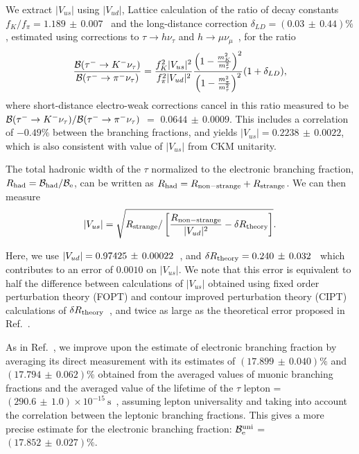 \documentclass[fleqn,twoside]{article}
\def\Vus  {\ensuremath{|V_{us}|}\xspace}
\def\Vud  {\ensuremath{|V_{ud}|}\xspace}
\def\mtau       {\ensuremath{\tau}\xspace}
\begin{document}
We extract $\Vus$ using $\Vud$, Lattice calculation of the ratio of decay constants
$f_K/f_\pi = 1.189\, \pm\, 0.007$~\cite{Follana:2007uv} and
the long-distance correction $\delta_{LD} = (0.03\, \pm\, 0.44)\%$,  
estimated using corrections to $\tau\to h\nu_\tau$ and $h \to \mu\nu_\mu$~\cite{LongDistance},
for the ratio
$$\frac{{\cal{B}}({\tau^- \to K^-\nu_\tau})}{{\cal{B}}({\tau^- \to \pi^-\nu_\tau})} 
=
\frac{f_K^2 |V_{us}|^2}{f_\pi^2 |V_{ud}|^2}
 \frac{\left( 1 -  \frac{m_K^2}{m_\tau^2} \right)^2}{\left( 1 -  \frac{m_\pi^2}{m_\tau^2} \right)^2} (1+\delta_{LD}),$$
where short-distance electro-weak corrections cancel in this ratio
measured to be
${{\cal{B}}({\tau^- \to K^-\nu_\tau})}/{{\cal{B}}({\tau^- \to \pi^-\nu_\tau})}$
$=$ $ 0.0644\, \pm\, 0.0009$.
This includes a correlation of $-0.49\%$
between the branching fractions, and yields $\Vus = 0.2238\, \pm\, 0.0022$,
which is also consistent with value of $\Vus$ from CKM unitarity.
 
The total hadronic width of the \mtau normalized to the electronic branching fraction,
$R_{\rm{had}} = {\cal{B}}_{\rm{had}}/{\cal{B}}_{\rm{e}}$,
can be written as $R_{\rm{had}} = R_{\rm{non-strange}} + R_{\rm{strange}}$.
We can then measure
$$|V_{us}| = \sqrt{R_{\rm{strange}}/\left[\frac{R_{\rm{non-strange}}}{|V_{ud}|^2} -  \delta R_{\rm{theory}}\right]}.$$


Here, we use $\Vud = \Vudvalue$~\cite{Hardy:2008gy}, and $\delta R_{\rm{theory}} = 0.240\, \pm\, 0.032$~\cite{Gamiz:2006xx} 
which contributes to an error of $0.0010$ on $|V_{us}|$.
We note that this error is equivalent to  half the difference between calculations of $|V_{us}|$ 
obtained using fixed order perturbation theory (FOPT) and 
contour improved perturbation theory (CIPT) calculations of $\delta R_{\rm{theory}}$~\cite{Maltman:2010hb}, 
and twice as large as the theoretical error proposed in Ref.~\cite{Gamiz:2007qs}.

As in Ref.~\cite{Davier:2005xq}, we improve upon the estimate of
electronic branching fraction by averaging its direct measurement 
with its estimates of $(17.899\, \pm\, 0.040)\%$ and $(17.794\, \pm\, 0.062)\%$
obtained from the averaged values of muonic branching fractions and 
the averaged value of the lifetime of the 
\mtau lepton = $(290.6\, \pm\, 1.0) \times 10^{-15} ~\mathrm{s}$~\cite{PDG_2010},
assuming lepton universality and taking into account the correlation between the leptonic branching fractions.
This gives a more precise estimate for the electronic branching fraction: ${\cal{B}}^{\rm{uni}}_{\rm{e}}$ = $ (17.852\, \pm\, 0.027)\%$.
\end{document}
